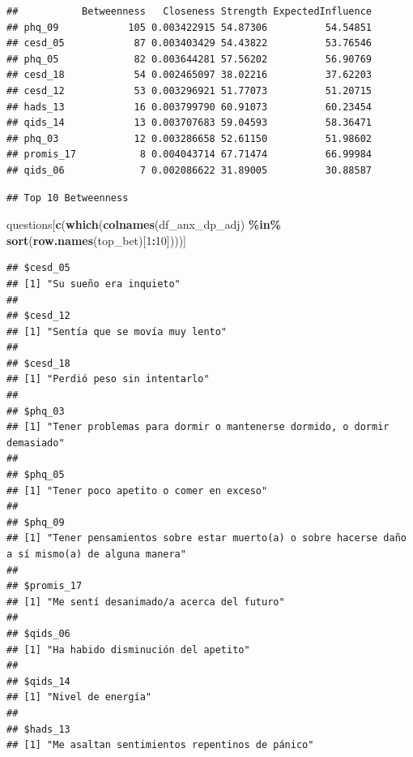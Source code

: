 \documentclass[
]{article}
\newenvironment{Shaded}{\begin{snugshade}}{\end{snugshade}}
\newcommand{\CommentTok}[1]{\textcolor[rgb]{0.56,0.35,0.01}{\textit{#1}}}
\newcommand{\DecValTok}[1]{\textcolor[rgb]{0.00,0.00,0.81}{#1}}
\newcommand{\FunctionTok}[1]{\textcolor[rgb]{0.13,0.29,0.53}{\textbf{#1}}}
\newcommand{\NormalTok}[1]{#1}
\newcommand{\SpecialCharTok}[1]{\textcolor[rgb]{0.81,0.36,0.00}{\textbf{#1}}}
\newcommand{\StringTok}[1]{\textcolor[rgb]{0.31,0.60,0.02}{#1}}
\begin{document}
\begin{verbatim}
##           Betweenness   Closeness Strength ExpectedInfluence
## phq_09            105 0.003422915 54.87306          54.54851
## cesd_05            87 0.003403429 54.43822          53.76546
## phq_05             82 0.003644281 57.56202          56.90769
## cesd_18            54 0.002465097 38.02216          37.62203
## cesd_12            53 0.003296921 51.77073          51.20715
## hads_13            16 0.003799790 60.91073          60.23454
## qids_14            13 0.003707683 59.04593          58.36471
## phq_03             12 0.003286658 52.61150          51.98602
## promis_17           8 0.004043714 67.71474          66.99984
## qids_06             7 0.002086622 31.89005          30.88587
\end{verbatim}

\begin{Shaded}
\end{Shaded}

\begin{verbatim}
## Top 10 Betweenness
\end{verbatim}

\begin{Shaded}
\begin{Highlighting}[]
\NormalTok{questions[}\FunctionTok{c}\NormalTok{(}\FunctionTok{which}\NormalTok{(}\FunctionTok{colnames}\NormalTok{(df\_anx\_dp\_adj) }\SpecialCharTok{\%in\%} \FunctionTok{sort}\NormalTok{(}\FunctionTok{row.names}\NormalTok{(top\_bet)[}\DecValTok{1}\SpecialCharTok{:}\DecValTok{10}\NormalTok{])))] }
\end{Highlighting}
\end{Shaded}

\begin{verbatim}
## $cesd_05
## [1] "Su sueño era inquieto"
## 
## $cesd_12
## [1] "Sentía que se movía muy lento"
## 
## $cesd_18
## [1] "Perdió peso sin intentarlo"
## 
## $phq_03
## [1] "Tener problemas para dormir o mantenerse dormido, o dormir demasiado"
## 
## $phq_05
## [1] "Tener poco apetito o comer en exceso"
## 
## $phq_09
## [1] "Tener pensamientos sobre estar muerto(a) o sobre hacerse daño a sí mismo(a) de alguna manera"
## 
## $promis_17
## [1] "Me sentí desanimado/a acerca del futuro"
## 
## $qids_06
## [1] "Ha habido disminución del apetito"
## 
## $qids_14
## [1] "Nivel de energía"
## 
## $hads_13
## [1] "Me asaltan sentimientos repentinos de pánico"
\end{verbatim}
\end{document}
